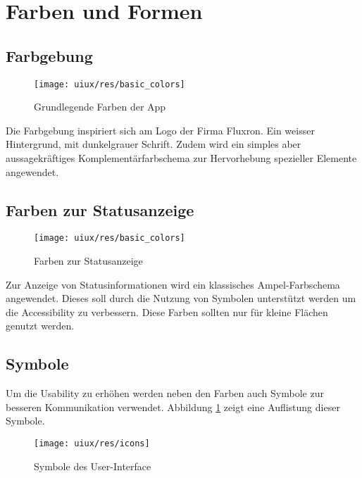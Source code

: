 
\section{Farben und Formen}
\label{sec:Farben und Formen}

\subsection{Farbgebung}
\label{subsec:Farbgebung}
\begin{figure}[H]
    \begin{center}
        \texttt{[image: uiux/res/basic\_colors]}
    \end{center}
    \caption{Grundlegende Farben der App}
\end{figure}
Die Farbgebung inspiriert sich am Logo der Firma Fluxron. Ein weisser Hintergrund, mit dunkelgrauer Schrift. Zudem wird ein simples aber aussagekräftiges Komplementärfarbschema zur Hervorhebung spezieller Elemente angewendet.

\subsection{Farben zur Statusanzeige}
\label{subsec:Farben zur Statusanzeige}
\begin{figure}[H]
    \begin{center}
        \texttt{[image: uiux/res/basic\_colors]}
    \end{center}
    \caption{Farben zur Statusanzeige}
\end{figure}
Zur Anzeige von Statusinformationen wird ein klassisches Ampel-Farbschema angewendet. Dieses soll durch die Nutzung von Symbolen unterstützt werden um die Accessibility zu verbessern. Diese Farben sollten nur für kleine Flächen genutzt werden.

\subsection{Symbole}
\label{subsec:Symbole}

Um die Usability zu erhöhen werden neben den Farben auch Symbole zur besseren Kommunikation verwendet. Abbildung \ref{abb:statusSymbols} zeigt eine Auflistung dieser Symbole.

\vspace{0.5cm}

\begin{figure}[H]
    \begin{center}
        \texttt{[image: uiux/res/icons]}
    \end{center}
    \caption{Symbole des User-Interface}
    \label{abb:statusSymbols}
\end{figure}

\pagebreak